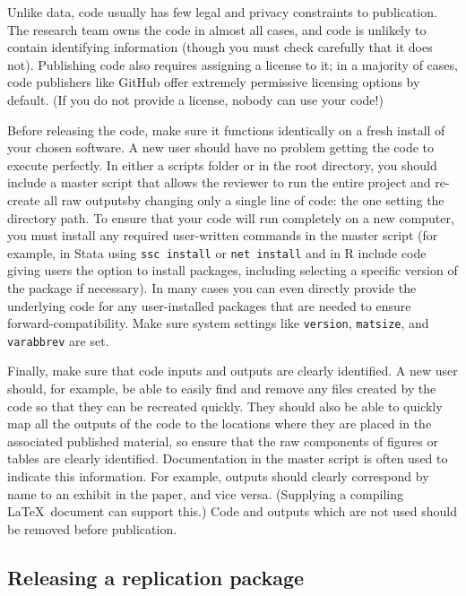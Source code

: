 Unlike data, code usually has few legal and privacy constraints to publication.
The research team owns the code in almost all cases,
and code is unlikely to contain identifying information 
(though you must check carefully that it does not).
Publishing code also requires assigning a license to it;
in a majority of cases, code publishers like GitHub
offer extremely permissive licensing options by default.
(If you do not provide a license, nobody can use your code!)

Before releasing the code, make sure it functions identically on a fresh install of your chosen software.
A new user should have no problem getting the code to execute perfectly.
In either a scripts folder or in the root directory,
you should include a master script that allows the reviewer to run the entire project
and re-create all raw outputsby changing only a single line of code: 
the one setting the directory path.
To ensure that your code will run completely on a new computer,
you must install any required user-written commands in the master script
(for example, in Stata using \texttt{ssc install} or \texttt{net install}
and in R include code giving users the option to install packages,
including selecting a specific version of the package if necessary).
In many cases you can even directly provide the underlying code
for any user-installed packages that are needed to ensure forward-compatibility.
Make sure system settings like \texttt{version}, \texttt{matsize}, and \texttt{varabbrev} are set.

Finally, make sure that code inputs and outputs are clearly identified.
A new user should, for example, be able to easily find and remove
any files created by the code so that they can be recreated quickly.
They should also be able to quickly map all the outputs of the code
to the locations where they are placed in the associated published material,
so ensure that the raw components of figures or tables are clearly identified.
Documentation in the master script is often used to indicate this information.
For example, outputs should clearly correspond by name to an exhibit in the paper, and vice versa.
(Supplying a compiling \LaTeX\ document can support this.)
Code and outputs which are not used should be removed before publication.

\subsection{Releasing a replication package}

